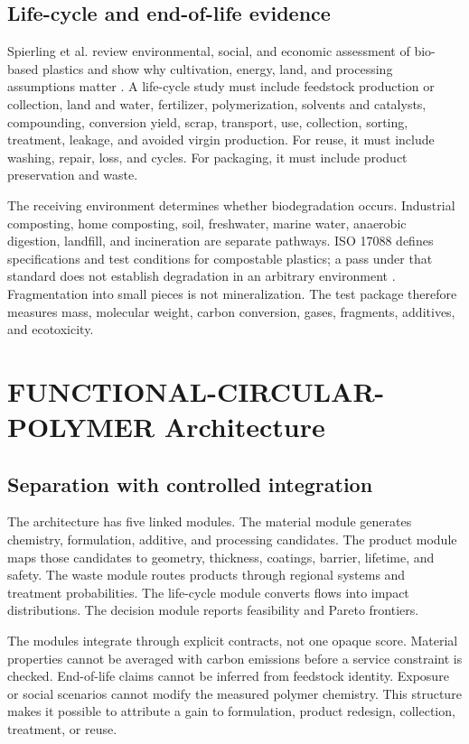 \documentclass[conference]{IEEEtran}
\begin{document}
\subsection{Life-cycle and end-of-life evidence}

Spierling et al. review environmental, social, and economic assessment of bio-based plastics and show why cultivation, energy, land, and processing assumptions matter \cite{spierling}. A life-cycle study must include feedstock production or collection, land and water, fertilizer, polymerization, solvents and catalysts, compounding, conversion yield, scrap, transport, use, collection, sorting, treatment, leakage, and avoided virgin production. For reuse, it must include washing, repair, loss, and cycles. For packaging, it must include product preservation and waste.

The receiving environment determines whether biodegradation occurs. Industrial composting, home composting, soil, freshwater, marine water, anaerobic digestion, landfill, and incineration are separate pathways. ISO 17088 defines specifications and test conditions for compostable plastics; a pass under that standard does not establish degradation in an arbitrary environment \cite{iso}. Fragmentation into small pieces is not mineralization. The test package therefore measures mass, molecular weight, carbon conversion, gases, fragments, additives, and ecotoxicity.

\section{FUNCTIONAL-CIRCULAR-POLYMER Architecture}

\subsection{Separation with controlled integration}

The architecture has five linked modules. The material module generates chemistry, formulation, additive, and processing candidates. The product module maps those candidates to geometry, thickness, coatings, barrier, lifetime, and safety. The waste module routes products through regional systems and treatment probabilities. The life-cycle module converts flows into impact distributions. The decision module reports feasibility and Pareto frontiers.

The modules integrate through explicit contracts, not one opaque score. Material properties cannot be averaged with carbon emissions before a service constraint is checked. End-of-life claims cannot be inferred from feedstock identity. Exposure or social scenarios cannot modify the measured polymer chemistry. This structure makes it possible to attribute a gain to formulation, product redesign, collection, treatment, or reuse.
\end{document}
